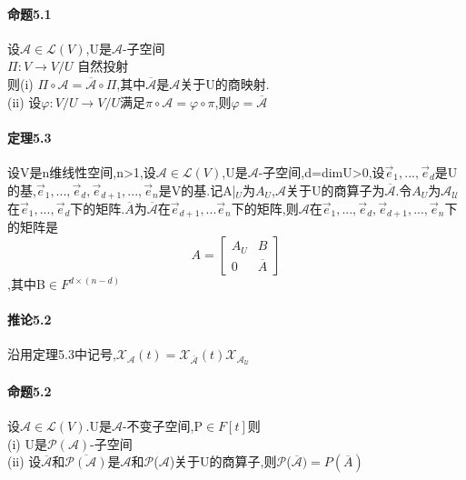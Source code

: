 \documentclass{ctexart}
\begin{document}
\paragraph{命题5.1}
设$\mathcal{A}\in\mathcal{L}(V)$,U是$\mathcal{A}$-子空间\\
$\Pi : V \to V/U$ 自然投射\\
则(i)  $\Pi \circ \mathcal{A} = \overline{\mathcal{A}} \circ \Pi$,其中$\overline{\mathcal{A}}$是$\mathcal{A}$关于U的商映射.\\
(ii) 设$\varphi : V/U \to V/U$满足$\pi \circ \mathcal{A} = \varphi \circ \pi$,则$\varphi = \overline{\mathcal{A}}$

\paragraph{定理5.3}
设V是n维线性空间,n>1,设$\mathcal{A}\in \mathcal{L}(V)$,U是$\mathcal{A}$-子空间,d=dimU>0,设$\vec{e}_{1},...,\vec{e}_{d}$是U的基,$\vec{e}_{1},...,\vec{e}_{d},\vec{e}_{d+1},...,\vec{e}_{n}$是V的基.记A|$_{U}$为$A_{U}$,$\mathcal{A}$关于U的商算子为$\overline{\mathcal{A}}$.令$A_{U}$为$\mathcal{A_{U}}$在$\vec{e}_{1},...,\vec{e}_{d}$下的矩阵.$\overline{A}$为$\overline{\mathcal{A}}$在$\vec{e}_{d+1},...\vec{e}_{n}$下的矩阵,则$\mathcal{A}$在$\vec{e}_{1},...,\vec{e}_{d},\vec{e}_{d+1},...,\vec{e}_{n}$下的矩阵是\\
\begin{equation}
A=
\left[ \begin{array}{cc}
A_{U} & B\\
0 & \overline{A}
\end{array} 
\right]
\end{equation},其中B$\in F^{d\times(n-d)}$

\paragraph{推论5.2}
沿用定理5.3中记号,$\mathcal{X_{\mathcal{A}}}(t)=\mathcal{X_{\overline{A}}}(t)\mathcal{X_{\mathcal{A_{U}}}}$

\paragraph{命题5.2}
设$\mathcal{A}\in\mathcal{L}(V)$.U是$\mathcal{A}$-不变子空间,P$\in F[t]$则\\
(i) U是$\mathcal{P}(\mathcal{A})$-子空间\\
(ii) 设$\overline{\mathcal{A}}$和$\mathcal{\overline{P(\mathcal{A})}}$是$\mathcal{A}$和$\mathcal{P}$($\mathcal{A}$)关于U的商算子,则$\mathcal{P}$($\overline{\mathcal{A}})=P(\overline{A})$
\end{document}
